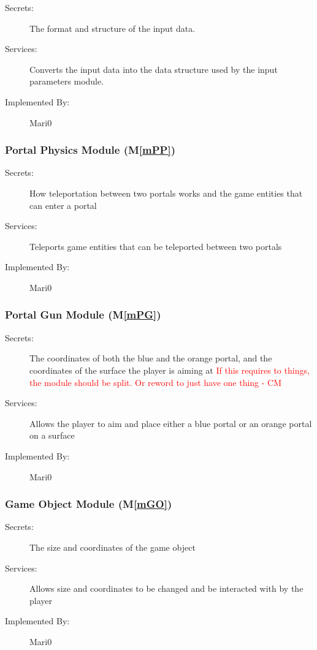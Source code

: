 \documentclass[12pt, titlepage]{article}
\newcommand{\mref}[1]{M\ref{#1}}
\begin{document}
\begin{description}
\item[Secrets:]The format and structure of the input data.
\item[Services:]Converts the input data into the data structure used by the
  input parameters module.
\item[Implemented By:] Mari0
\end{description}

\subsubsection{Portal Physics Module (\mref{mPP})}
\begin{description}
\item[Secrets:] How teleportation between two portals works and the game entities that can enter a portal
\item[Services:] Teleports game entities that can be teleported between two portals
\item[Implemented By:] Mari0
\end{description}

\subsubsection{Portal Gun Module (\mref{mPG})}
\begin{description}
\item[Secrets:] The coordinates of both the blue and the orange portal, and the coordinates of the surface the player is aiming at \textcolor{red}{If this requires to things, the module should be split. Or reword to just have one thing - CM} \\
\item[Services:] Allows the player to aim and place either a blue portal or an orange portal on a surface
\item[Implemented By:] Mari0
\end{description}

\subsubsection{Game Object Module (\mref{mGO})}
\begin{description}
\item[Secrets: ]The size and coordinates of the game object
\item[Services:]Allows size and coordinates to be changed and be interacted with by the player
\item[Implemented By:] Mari0
\end{description}
\end{document}
